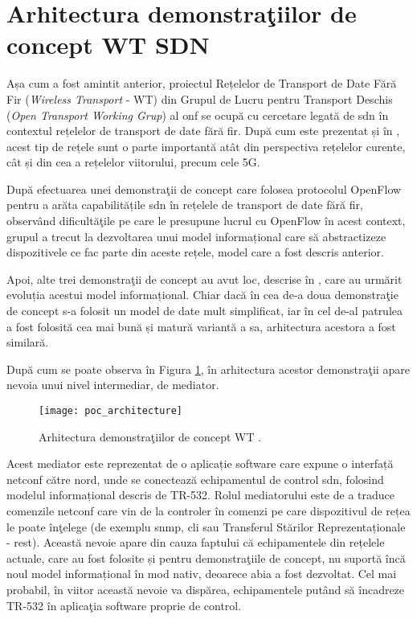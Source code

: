 \section{Arhitectura demonstraţiilor de concept WT SDN}

Așa cum a fost amintit anterior, proiectul Rețelelor de Transport de Date Fără Fir (\textit{Wireless Transport} - WT) din Grupul de Lucru pentru Transport Deschis (\textit{Open Transport Working Grup}) al \gls{onf} se ocupă cu cercetare legată de \gls{sdn} în contextul rețelelor de transport de date fără fir. După cum este prezentat și în \cite{bercovich2015software, bernardos2014architecture}, acest tip de rețele sunt o parte importantă atât din perspectiva rețelelor curente, cât și din cea a rețelelor viitorului, precum cele 5G.

După efectuarea unei demonstraţii de concept \cite{onf2015_poc1} care folosea protocolul OpenFlow pentru a arăta capabilitățile \gls{sdn} în rețelele de transport de date fără fir, observând dificultăţile pe care le presupune lucrul cu OpenFlow în acest context, grupul a trecut la dezvoltarea unui model informațional care să abstractizeze dispozitivele ce fac parte din aceste rețele, model care a fost descris anterior.

Apoi, alte trei demonstraţii de concept au avut loc, descrise în \cite{onf2016_poc2, onf2016_poc3, onf2017_poc4}, care au urmărit evoluția acestui model informațional. Chiar dacă în cea de-a doua demonstraţie de concept s-a folosit un model de date mult simplificat, iar în cel de-al patrulea a fost folosită cea mai bună și matură variantă a sa, arhitectura acestora a fost similară.

După cum se poate observa în Figura \ref{fig:poc_architecture}, în arhitectura acestor demonstraţii apare nevoia unui nivel intermediar, de mediator. 

\begin{figure}[h]
	\centering
	\texttt{[image: poc\_architecture]}
	\caption{Arhitectura demonstraţiilor de concept WT \cite{onf2015_poc1, onf2016_poc2, onf2016_poc3}.}
	\label{fig:poc_architecture}
\end{figure}

Acest mediator este reprezentat de o aplicație software care expune o interfață \gls{netconf} către nord, unde se conectează echipamentul de control \gls{sdn}, folosind modelul informațional descris de TR-532. Rolul mediatorului este de a traduce comenzile \gls{netconf} care vin de la controler în comenzi pe care dispozitivul de rețea le poate înţelege (de exemplu \gls{snmp}, \gls{cli} sau Transferul Stărilor Reprezentaționale - \gls{rest}). Această nevoie apare din cauza faptului că echipamentele din rețelele actuale, care au fost folosite și pentru demonstraţiile de concept, nu suportă încă noul model informațional în mod nativ, deoarece abia a fost dezvoltat. Cel mai probabil, în viitor această nevoie va dispărea, echipamentele putând să încadreze TR-532 în aplicaţia software proprie de control.

